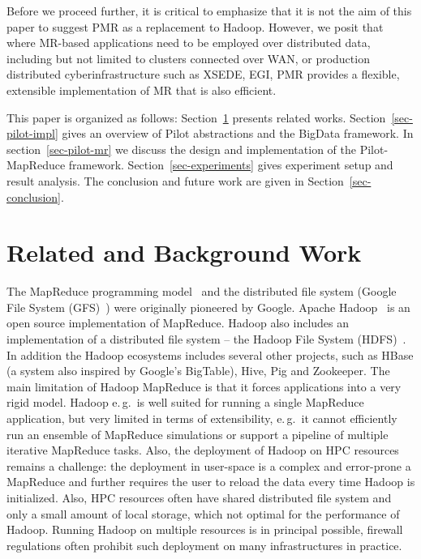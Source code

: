 \documentclass{acm_proc_article-sp}
\newcommand{\upp}{\vspace*{-0.5em}}
\newcommand{\pilot}{Pilot\xspace}
\newcommand{\pilotmapreduce}{Pilot-MapReduce\xspace}
\begin{document}
Before we proceed further, it is critical to emphasize that it is not
the aim of this paper to suggest PMR as a replacement to Hadoop.
However, we posit that where MR-based applications need to be employed
over distributed data, including but not limited to clusters connected
over WAN, or production distributed cyberinfrastructure such as XSEDE,
EGI, PMR provides a flexible, extensible implementation of MR that is
also efficient.
 

This paper is organized as follows: Section~\ref{sec:related_work} presents
related works. Section~\ref{sec-pilot-impl} gives an overview of \pilot
abstractions and the BigData framework. In section~\ref{sec-pilot-mr} we discuss
the design and implementation of the \pilotmapreduce framework.
Section~\ref{sec-experiments} gives experiment setup and result analysis. The
conclusion and future work are given in Section~\ref{sec-conclusion}.

\upp\upp

\section{Related and Background Work}
\label{sec:related_work}
The MapReduce programming model~\cite{Dean:2004:MSD:1251254.1251264} and the
distributed file system (Google File System
(GFS)~\cite{Ghemawat:2003:GFS:1165389.945450}) were originally pioneered by
Google. Apache Hadoop~\cite{hadoop} is an open source implementation of
MapReduce. Hadoop also includes an implementation of a distributed file system
-- the Hadoop File System (HDFS)~\cite{Borthakur:2007fk}. In addition the
Hadoop ecosystems includes several other projects, such as HBase (a system
also inspired by Google's BigTable), Hive, Pig and Zookeeper. The main
limitation of Hadoop MapReduce is that it forces applications into a very
rigid model. Hadoop e.\,g.\ is well suited for running a single MapReduce
application, but very limited in terms of extensibility, e.\,g.\ it cannot
efficiently run an ensemble of MapReduce simulations or support a pipeline of
multiple iterative MapReduce tasks. Also, the deployment of Hadoop on HPC
resources remains a challenge: the deployment in user-space is a complex and
error-prone a MapReduce and further requires the user to reload the data every
time Hadoop is initialized. Also, HPC resources often have shared distributed
file system and only a small amount of local storage, which not optimal for
the performance of Hadoop. Running Hadoop on multiple resources is in
principal possible, firewall regulations often prohibit such deployment on
many infrastructures in practice.
\end{document}

